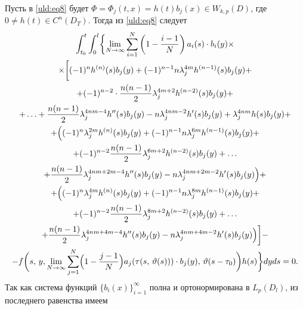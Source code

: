 Пусть в \eqref{uld:eq8} будет $\Phi =\Phi _j (t,  x)=h (t) b_j (x)\in W_{k,p}  ( D )$, где $0\ne h (t) \in C^n (D_T)$. Тогда из \eqref{uld:eq8} следует
\begin{multline*}
\int_{t_0}^t \int_0^l \biggl\{ \lim \limits_{N \to \infty } \sum \limits_{i =1}^N \left(
1-\frac{i-1}{N} \right)  a_i (s)\cdot b_i (y) \times 
\\
\times  \biggl[ (-1)^n h^{(n)}(s) b_j (y)+ ( -1)^{ n-1}n
\lambda_j^{4 m}  h^{(n-1)}(s) b_j (y)+
\\
+ ( -1)^{ n-2}\cdot \frac{n (n-1)}{2} \lambda _j^{ 4 m+2}
 h^{(n-2)}(s) b_j (y)+
 \\
+ \ldots  + \frac{n (n-1)}{2} \lambda_j^{ 4 n m-4}
 h''(s) b_j (y)-n\lambda _j^{ 4 n m-2}
 h'(s) b_j (y)+\lambda _j^{ 4 n m}
 h (s) b_j (y)+ 
 \\
+ \Bigl(( -1)^n \lambda_j^{ 2 m} h^{(n)}(s) b_j (y)+
( -1)^{ n-1}n \lambda_j^{6 m}  h^{(n-1)}(s) b_j (y)+ 
\\
+ (-1)^{n-2}\frac{n (n-1)}{2} \lambda _j^{ 6 m+2}
 h^{(n-2)}(s) b_j (y)+   \ldots 
 \\
+ \frac{n (n-1)}{2} \lambda _j^{ 4 n m+2
m-4}  h''(s) b_j (y)-n\lambda _j^{4 n m+2 m-2}
 h'(s) b_j (y)\Bigr)+ 
 \\
+ \Bigl( ( -1)^n \lambda_j^{4 m} h^{(n)}(s) b_j (y) +
(-1)^{n-1} n \lambda_j ^{8 m} h^{(n-1)}(s) b_j (y)+
\\
+ ( -1)^{ n-2}\frac{n (n-1)}{2} \lambda_j^{8 m+2}
h^{(n-2)}(s) b_j (y) + \ldots
\\
 + \frac{n (n-1)}{2} \lambda
_j^{4 n m+4 m-4}  h''(s) b_j (y)-n \lambda_j^{4 n m+4 m-2} h'(s) b_j (y)\Bigr)\biggr]- 
\\
-f
\biggl( s,\,y, \lim \limits_{N \to \infty } \sum \limits_{j =1}^N
\Bigl( 1-\frac{j-1}{N} \Bigr) a_j ( \tau (s,\,\vartheta (s))) \cdot b_j (y), \,\vartheta
(s - \tau_0) \biggr)  h (s) \biggr\} dy  ds=0.
\end{multline*}
Так как система функций $\{ b_i(x) \}_{ i=1}^\infty $ полна и ортонормирована в $L_p (D_l)$,  из последнего равенства имеем
